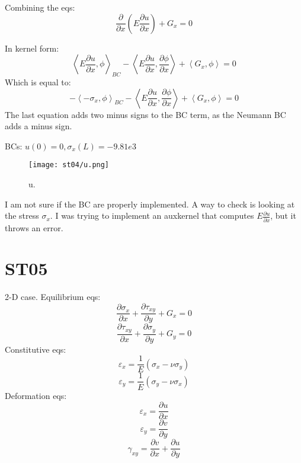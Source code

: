 \documentclass[11pt,letterpaper]{article}
\begin{document}
Combining the eqs:
\begin{equation}
\frac{\partial}{\partial x}(E \frac{\partial u}{\partial x}) + G_x = 0
\end{equation}

In kernel form:
\begin{equation}
\left< E \frac{\partial u}{\partial x}, \phi \right>_{BC} - \left< E \frac{\partial u}{\partial x}, \frac{\partial \phi}{\partial x} \right>
+ \left< G_x , \phi \right> = 0
\end{equation}
Which is equal to:
\begin{equation}
-\left< -\sigma_x, \phi \right>_{BC} - \left< E \frac{\partial u}{\partial x}, \frac{\partial \phi}{\partial x} \right>
+ \left< G_x , \phi \right> = 0
\end{equation}
The last equation adds two minus signs to the BC term, as the Neumann BC adds a minus sign.

BCs: $u(0)=0, \sigma_x(L)=-9.81e3$

\begin{figure}[H]
	\centering
	\texttt{[image: st04/u.png]}
	\hfill
	\caption{u.}
	\label{fig:st04}
\end{figure}

I am not sure if the BC are properly implemented. A way to check is looking at the stress $\sigma_x$.
I was trying to implement an auxkernel that computes $E \frac{\partial u}{\partial x}$, but it throws an error.

\section{ST05}

2-D case.
Equilibrium eqs:
\begin{equation}
\frac{\partial \sigma_x}{\partial x} + \frac{\partial \tau_{xy}}{\partial y} + G_x = 0
\end{equation}
\begin{equation}
\frac{\partial \tau_{xy}}{\partial x} + \frac{\partial \sigma_y}{\partial y} + G_y = 0
\end{equation}
Constitutive eqs:
\begin{equation}
\varepsilon_x = \frac{1}{E} (\sigma_x - \nu \sigma_y)
\end{equation}
\begin{equation}
\varepsilon_y = \frac{1}{E} (\sigma_y - \nu \sigma_x)
\end{equation}
Deformation eqs:
\begin{equation}
\varepsilon_x = \frac{\partial u}{\partial x}
\end{equation}
\begin{equation}
\varepsilon_y = \frac{\partial v}{\partial y}
\end{equation}
\begin{equation}
\gamma_{xy} = \frac{\partial v}{\partial x} + \frac{\partial u}{\partial y}
\end{equation}
\end{document}
